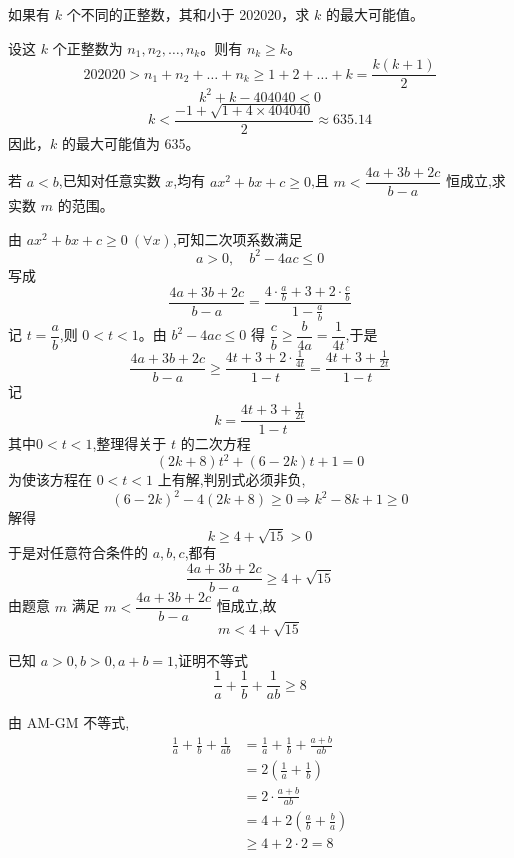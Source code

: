 \begin{questions}
    \question 如果有 $k$ 个不同的正整数，其和小于 202020，求 $k$ 的最大可能值。

\begin{solution}
设这 $k$ 个正整数为 $n_1, n_2, \dots, n_k$。则有 $n_k \ge k$。
\[
202020 > n_1 + n_2 + \dots + n_k \ge 1 + 2 + \dots + k = \frac{k(k + 1)}{2}
\]
\[
k^2 + k - 404040 < 0
\]
\[
k < \frac{-1 + \sqrt{1 + 4 \times 404040}}{2} \approx 635.14
\]
因此，$k$ 的最大可能值为 635。
\end{solution}

    \question 若 $a<b$,已知对任意实数 $x$,均有 $ax^2+bx+c\ge 0$,且 $m<\dfrac{4a+3b+2c}{b-a}$ 恒成立,求实数 $m$ 的范围。
    \begin{solution}
        由 $ax^2+bx+c\ge0\ (\forall x)$,可知二次项系数满足
        \[
        a>0,\quad b^2-4ac\le0
        \]
        写成
        \[
        \frac{4a+3b+2c}{b-a}
        =\frac{4\cdot\frac{a}{b}+3+2\cdot\frac{c}{b}}{1-\frac{a}{b}}
        \]
        记 $t=\dfrac{a}{b}$,则 $0<t<1$。由 $b^2-4ac\le0$ 得 $\dfrac{c}{b}\ge \dfrac{b}{4a}=\dfrac{1}{4t}$,于是
        \[
        \frac{4a+3b+2c}{b-a}
        \ge \frac{4t+3+2\cdot\frac{1}{4t}}{1-t}
        = \frac{4t+3+\frac{1}{2t}}{1-t}
        \]
        记
        \[
        k=\frac{4t+3+\frac{1}{2t}}{1-t}
        \]
        其中$0<t<1$,整理得关于 $t$ 的二次方程
        \[
        (2k+8)t^2+(6-2k)t+1=0
        \]
        为使该方程在 $0<t<1$ 上有解,判别式必须非负,
        \[
        (6-2k)^2-4(2k+8)\ge0 \Rightarrow k^2-8k+1 \ge 0 
        \]
        解得
        \[
        k \ge 4+\sqrt{15}>0
        \]
        于是对任意符合条件的 $a,b,c$,都有
        \[
        \frac{4a+3b+2c}{b-a}\ge 4+\sqrt{15}
        \]
        由题意 $m$ 满足 $m<\dfrac{4a+3b+2c}{b-a}$ 恒成立,故 
        \[
        m<4+\sqrt{15}
        \]
    \end{solution}

    \question 已知 $a>0, b>0, a+b=1$,证明不等式
    \[
    \frac{1}{a} + \frac{1}{b} + \frac{1}{ab} \ge 8
    \]
    \begin{solution}
        由 AM-GM 不等式,
        \begin{align*}
        \frac{1}{a} + \frac{1}{b} + \frac{1}{ab} &= \frac{1}{a} + \frac{1}{b} + \frac{a+b}{ab} \\
        &= 2\left(\frac{1}{a} + \frac{1}{b}\right) \\
        &= 2 \cdot \frac{a+b}{ab} \\
        &= 4 + 2\left(\frac{a}{b} + \frac{b}{a}\right) \\
        &\ge 4 + 2\cdot 2 = 8
        \end{align*}
    \end{solution}


\end{questions}

